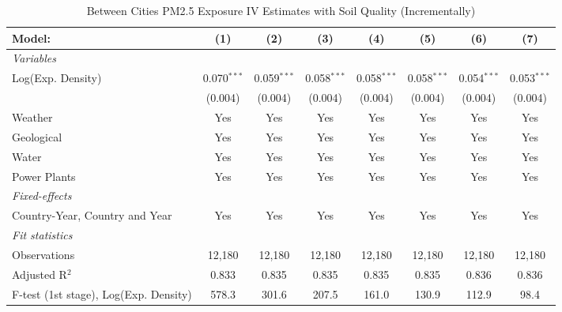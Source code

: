 
\begin{table}[htbp]
   \caption{\label{tab:iv_soil_rob1} Between Cities PM2.5 Exposure IV Estimates with Soil Quality (Incrementally)}
   \centering
   \small
   \begin{tabular}{lccccccc}
      \tabularnewline \midrule \midrule
      Model:                                & (1)           & (2)           & (3)           & (4)           & (5)           & (6)           & (7)\\  
      \midrule
      \emph{Variables}\\
      Log(Exp. Density)                     & 0.070$^{***}$ & 0.059$^{***}$ & 0.058$^{***}$ & 0.058$^{***}$ & 0.058$^{***}$ & 0.054$^{***}$ & 0.053$^{***}$\\   
                                            & (0.004)       & (0.004)       & (0.004)       & (0.004)       & (0.004)       & (0.004)       & (0.004)\\   
      Weather                               & Yes           & Yes           & Yes           & Yes           & Yes           & Yes           & Yes\\  
      Geological                            & Yes           & Yes           & Yes           & Yes           & Yes           & Yes           & Yes\\  
      Water                                 & Yes           & Yes           & Yes           & Yes           & Yes           & Yes           & Yes\\  
      Power Plants                          & Yes           & Yes           & Yes           & Yes           & Yes           & Yes           & Yes\\  
      \midrule
      \emph{Fixed-effects}\\
      Country-Year, Country and Year        & Yes           & Yes           & Yes           & Yes           & Yes           & Yes           & Yes\\  
      \midrule
      \emph{Fit statistics}\\
      Observations                          & 12,180        & 12,180        & 12,180        & 12,180        & 12,180        & 12,180        & 12,180\\  
      Adjusted R$^2$                        & 0.833         & 0.835         & 0.835         & 0.835         & 0.835         & 0.836         & 0.836\\  
      F-test (1st stage), Log(Exp. Density) & 578.3         & 301.6         & 207.5         & 161.0         & 130.9         & 112.9         & 98.4\\  

\end{tabular}
\end{table}
